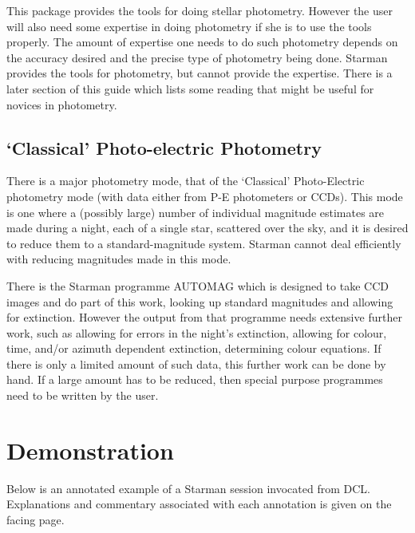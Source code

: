 This package provides the tools for doing stellar photometry. However the
user will also need some expertise in doing photometry if she is to use the
tools properly. The amount of expertise one needs to do such photometry
depends on the accuracy desired and the precise type of photometry being
done. Starman provides the tools for photometry, but cannot provide the
expertise. There is a later section of this guide which lists some reading
that might be useful for novices in photometry. 

\subsection{`Classical' Photo-electric Photometry}

There is a major photometry mode, that of the `Classical' Photo-Electric
photometry mode (with data either from P-E photometers or CCDs). This mode
is one where a (possibly large) number of individual magnitude estimates
are made during a night, each of a single star, scattered over the sky, and
it is desired to reduce them to a standard-magnitude system. Starman cannot
deal efficiently with  reducing magnitudes made in this mode. 

There is the Starman programme AUTOMAG which is designed to take CCD images
and do part of this work, looking up standard magnitudes and allowing for
extinction. However the output from that programme needs extensive further
work, such as allowing for errors in the night's extinction, allowing for
colour, time, and/or azimuth dependent extinction, determining colour
equations. If there is only a limited amount of such data, this further work 
can be done by hand. If a large amount has to be reduced, then special 
purpose programmes need to be written by the user.

\newpage

\section{Demonstration}
\label{se:demo}

Below is an annotated example  of a Starman  session invocated from
{\small DCL}.  Explanations and commentary associated with each annotation
is given on the facing page.

